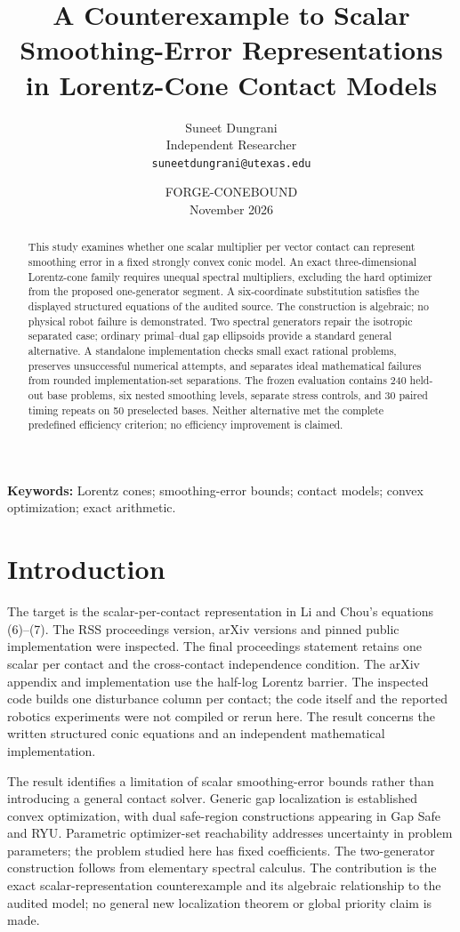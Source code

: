 \documentclass[10pt]{article}
\title{A Counterexample to Scalar Smoothing-Error Representations\\in Lorentz-Cone Contact Models}
\author{Suneet Dungrani\\Independent Researcher\\\texttt{suneetdungrani@utexas.edu}}
\date{FORGE-CONEBOUND\\November 2026}
\begin{document}
\maketitle
\begin{abstract}
This study examines whether one scalar multiplier per vector contact can represent smoothing error in a fixed strongly convex conic model. An exact three-dimensional Lorentz-cone family requires unequal spectral multipliers, excluding the hard optimizer from the proposed one-generator segment. A six-coordinate substitution satisfies the displayed structured equations of the audited source. The construction is algebraic; no physical robot failure is demonstrated. Two spectral generators repair the isotropic separated case; ordinary primal--dual gap ellipsoids provide a standard general alternative. A standalone implementation checks small exact rational problems, preserves unsuccessful numerical attempts, and separates ideal mathematical failures from rounded implementation-set separations. The frozen evaluation contains 240 held-out base problems, six nested smoothing levels, separate stress controls, and 30 paired timing repeats on 50 preselected bases. Neither alternative met the complete predefined efficiency criterion; no efficiency improvement is claimed.
\end{abstract}
\noindent\textbf{Keywords:} Lorentz cones; smoothing-error bounds; contact models; convex optimization; exact arithmetic.


\section{Introduction}
The target is the scalar-per-contact representation in Li and Chou's equations (6)--(7)\cite{li2026rss,li2026arxiv}. The RSS proceedings version, arXiv versions and pinned public implementation were inspected. The final proceedings statement retains one scalar per contact and the cross-contact independence condition. The arXiv appendix and implementation use the half-log Lorentz barrier. The inspected code builds one disturbance column per contact; the code itself and the reported robotics experiments were not compiled or rerun here. The result concerns the written structured conic equations and an independent mathematical implementation.

The result identifies a limitation of scalar smoothing-error bounds rather than introducing a general contact solver. Generic gap localization is established convex optimization, with dual safe-region constructions appearing in Gap Safe\cite{gap} and RYU\cite{ryu}. Parametric optimizer-set reachability\cite{gould} addresses uncertainty in problem parameters; the problem studied here has fixed coefficients. The two-generator construction follows from elementary spectral calculus. The contribution is the exact scalar-representation counterexample and its algebraic relationship to the audited model; no general new localization theorem or global priority claim is made.
\end{document}
